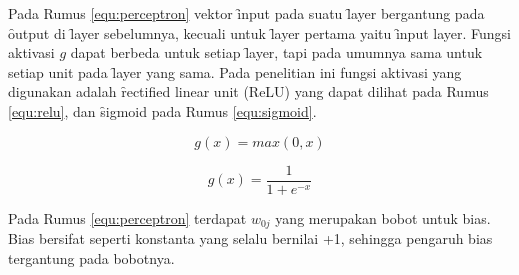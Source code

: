 Pada Rumus \ref{equ:perceptron} vektor \f{input} pada suatu \f{layer} bergantung pada \f{output} di \f{layer} sebelumnya, kecuali untuk \f{layer} pertama yaitu \f{input layer}. Fungsi aktivasi $g$ dapat berbeda untuk setiap \f{layer}, tapi pada umumnya sama untuk setiap unit pada \f{layer} yang sama. Pada penelitian ini fungsi aktivasi yang digunakan adalah \f{rectified linear unit} (ReLU) yang dapat dilihat pada Rumus \ref{equ:relu}, dan \f{sigmoid} pada Rumus \ref{equ:sigmoid}.

\begin{equation}
\label{equ:relu}
g(x) = max(0, x)
\end{equation}

\begin{equation}
\label{equ:sigmoid}
g(x) = \frac{1}{1 + e^{-x}}
\end{equation}

Pada Rumus \ref{equ:perceptron} terdapat $w_{0j}$ yang merupakan bobot untuk bias. Bias bersifat seperti konstanta yang selalu bernilai +1, sehingga pengaruh bias tergantung pada bobotnya.

